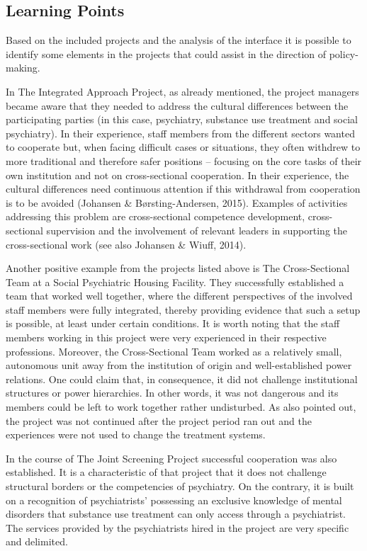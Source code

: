 \begin{multicols}{2}
\chapter{Learning Points}
Based on the included projects and the analysis of the interface it is possible to identify some elements in the projects that could assist in the direction of policy-making.
\par
In The Integrated Approach Project, as already mentioned, the project managers became aware that they needed to address the cultural differences between the participating parties (in this case, psychiatry, substance use treatment and social psychiatry). In their experience, staff members from the different sectors wanted to cooperate but, when facing difficult cases or situations, they often withdrew to more traditional and therefore safer positions – focusing on the core tasks of their own institution and not on cross-sectional cooperation. In their experience, the cultural differences need continuous attention if this withdrawal from cooperation is to be avoided (Johansen \& Børsting-Andersen, 2015). Examples of activities addressing this problem are cross-sectional competence development, cross-sectional supervision and the involvement of relevant leaders in supporting the cross-sectional work (see also Johansen \& Wiuff, 2014).
\par
Another positive example from the projects listed above is The Cross-Sectional Team at a Social Psychiatric Housing Facility. They successfully established a team that worked well together, where the different perspectives of the involved staff members were fully integrated, thereby providing evidence that such a setup is possible, at least under certain conditions. It is worth noting that the staff members working in this project were very experienced in their respective professions. Moreover, the Cross-Sectional Team worked as a relatively small, autonomous unit away from the institution of origin and well-established power relations. One could claim that, in consequence, it did not challenge institutional structures or power hierarchies. In other words, it was not dangerous and its members could be left to work together rather undisturbed. As also pointed out, the project was not continued after the project period ran out and the experiences were not used to change the treatment systems.
\par
In the course of The Joint Screening Project successful cooperation was also established. It is a characteristic of that project that it does not challenge structural borders or the competencies of psychiatry. On the contrary, it is built on a recognition of psychiatrists’ possessing an exclusive knowledge of mental disorders that substance use treatment can only access through a psychiatrist. The services provided by the psychiatrists hired in the project are very specific and delimited.

\end{multicols}
